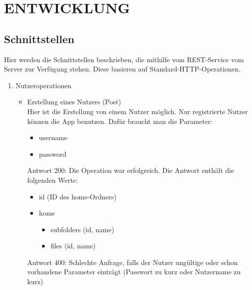 \documentclass[a4paper,twoside]{article}
\begin{document}
	\section{\uppercase{Entwicklung}}
	\subsection{Schnittstellen}
	Hier werden die Schnittstellen beschrieben, die mithilfe vom REST-Service vom Server zur Verf\"ugung stehen. Diese basieren auf Standard-HTTP-Operationen.
	\begin{enumerate}
		\item Nutzeroperationen
		\begin{itemize}
			\item Erstellung eines Nutzers (Post)\\
			Hier ist die Erstellung von einem Nutzer m\"oglich. Nur registrierte Nutzer k\"onnen die App benutzen. Daf\"ur braucht man die Parameter: 
			\begin{itemize}
				\item username 
				\item password
			\end{itemize}
			Antwort 200: Die Operation war erfolgreich. Die Antwort enth\"alt die folgenden Werte:
			\begin{itemize}
				\item id (ID des home-Ordners)
				\item home
				\begin{itemize}
					\item subfolders (id, name)
					\item files (id, name)
				\end{itemize}
			\end{itemize}
			
			Antwort 400: Schlechte Anfrage, falls der Nutzer ung\"ultige oder schon vorhandene Parameter eintr\"agt (Passwort zu kurz oder Nutzername zu kurz)
			

\end{itemize}
\end{enumerate}
\end{document}
